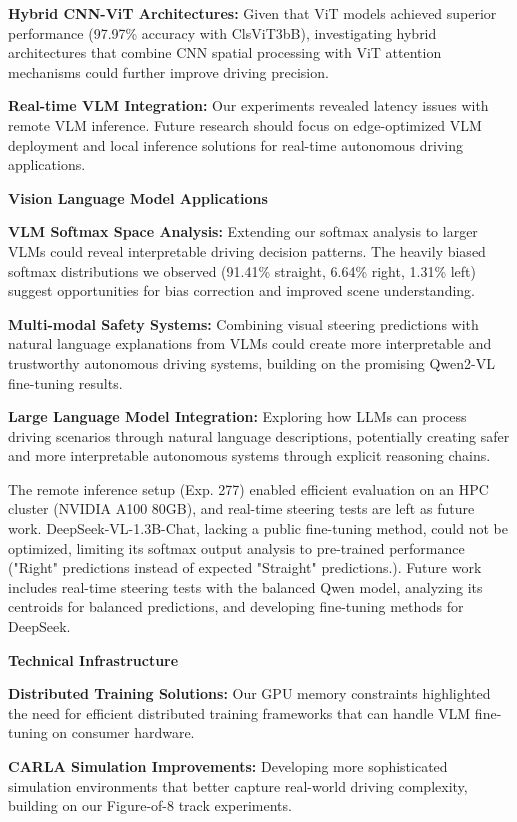 \textbf{Hybrid CNN-ViT Architectures:} Given that ViT models achieved superior performance (97.97\% accuracy with ClsViT3bB), investigating hybrid architectures that combine CNN spatial processing with ViT attention mechanisms could further improve driving precision.

\textbf{Real-time VLM Integration:} Our experiments revealed latency issues with remote VLM inference. Future research should focus on edge-optimized VLM deployment and local inference solutions for real-time autonomous driving applications.

\textbf{Vision Language Model Applications}

\textbf{VLM Softmax Space Analysis:} Extending our softmax analysis to larger VLMs could reveal interpretable driving decision patterns. The heavily biased softmax distributions we observed (91.41\% straight, 6.64\% right, 1.31\% left) suggest opportunities for bias correction and improved scene understanding.

\textbf{Multi-modal Safety Systems:} Combining visual steering predictions with natural language explanations from VLMs could create more interpretable and trustworthy autonomous driving systems, building on the promising Qwen2-VL fine-tuning results.

\textbf{Large Language Model Integration:} Exploring how LLMs can process driving scenarios through natural language descriptions, potentially creating safer and more interpretable autonomous systems through explicit reasoning chains.

The remote inference setup (Exp. 277) enabled efficient evaluation on an HPC cluster (NVIDIA A100 80GB), and real-time steering tests are left as future work. DeepSeek-VL-1.3B-Chat, lacking a public fine-tuning method, could not be optimized, limiting its softmax output analysis to pre-trained performance ("Right" predictions instead of expected "Straight" predictions.). 
Future work includes real-time steering tests with the balanced Qwen model, analyzing its centroids for balanced predictions, and developing fine-tuning methods for DeepSeek. 

\textbf{Technical Infrastructure}

\textbf{Distributed Training Solutions:} Our GPU memory constraints highlighted the need for efficient distributed training frameworks that can handle VLM fine-tuning on consumer hardware.

\textbf{CARLA Simulation Improvements:} Developing more sophisticated simulation environments that better capture real-world driving complexity, building on our Figure-of-8 track experiments.

